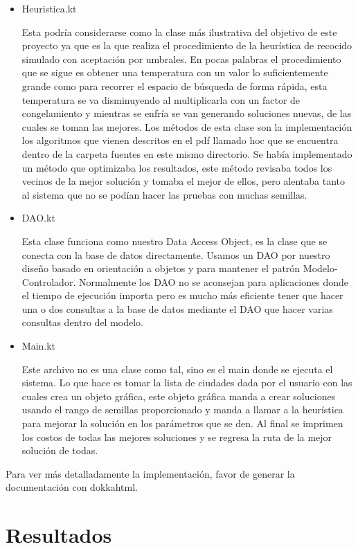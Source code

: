 \documentclass{article}
\begin{document}
\begin{itemize}
{	}
	\item {Heuristica.kt
		
		Esta podría considerarse como la clase más ilustrativa del objetivo de este proyecto ya que es la que realiza el procedimiento de la heurística de recocido simulado con aceptación por umbrales. En pocas palabras el procedimiento que se sigue es obtener una temperatura con un valor lo suficientemente grande como para recorrer el espacio de búsqueda de forma rápida, esta temperatura se va disminuyendo al multiplicarla con un factor de congelamiento y mientras se enfría se van generando soluciones nuevas, de las cuales se toman las mejores. Los métodos de esta clase son la implementación los algoritmos que vienen descritos en el pdf llamado hoc que se encuentra dentro de la carpeta fuentes en este mismo directorio. Se había implementado un método que optimizaba los resultados, este método revisaba todos los vecinos de la mejor solución y tomaba el mejor de ellos, pero alentaba tanto al sistema que no se podían hacer las pruebas con muchas semillas.
	
	}
	\item {DAO.kt
		
		Esta clase funciona como nuestro Data Access Object, es la clase que se conecta con la base de datos directamente. Usamos un DAO por nuestro diseño basado en orientación a objetos y para mantener el patrón Modelo-Controlador. Normalmente los DAO no se aconsejan para aplicaciones donde el tiempo de ejecución importa pero es mucho más eficiente tener que hacer una o dos consultas a la base de datos mediante el DAO que hacer varias consultas dentro del modelo.
	}
	\item {Main.kt
		
		Este archivo no es una clase como tal, sino es el main donde se ejecuta el sistema. Lo que hace es tomar la lista de ciudades dada por el usuario con las cuales crea un objeto gráfica, este objeto gráfica manda a crear soluciones usando el rango de semillas proporcionado y manda a llamar a la heurística para mejorar la solución en los parámetros que se den. Al final se imprimen los costos de todas las mejores soluciones y se regresa la ruta de la mejor solución de todas.
	}
\end{itemize}

Para ver más detalladamente la implementación, favor de generar la documentación con dokkahtml.


\section{Resultados}
\end{document}
